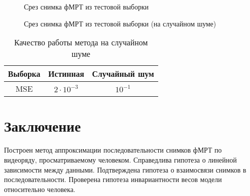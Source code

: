 \documentclass[a4paper, 12pt]{article}
\begin{document}
	\begin{figure}[h!]
		\centering
		\hfill
		\hfill
		\caption{Срез снимка фМРТ из тестовой выборки}
		\label{fig:7}
	\end{figure}

	\begin{figure}[h!]
		\centering
		\hfill
		\hfill
		\caption{Срез снимка фМРТ из тестовой выборки (на случайном шуме)}
		\label{fig:8}
	\end{figure}

	\begin{table}[h!]
		\centering
		\begin{tabular}{|c|c|c|}
			\hline
			Выборка	&	Истинная	&	Случайный шум \\ \hline \hline
			MSE		& 	$2 \cdot 10^{-3}$	 &		$10^{-1}$ \\ \hline
		\end{tabular}
		\caption{Качество работы метода на случайном шуме}
		\label{table:2}
	\end{table}

\newpage

\section{Заключение}

	Построен метод аппроксимации последовательности снимков фМРТ по видеоряду,
	просматриваемому человеком.
	Справедлива гипотеза о линейной зависимости между данными.
	Подтверждена гипотеза о взаимосвязи снимков в последовательности.
	Проверена гипотеза инвариантности весов модели относительно человека.

\newpage



\end{document}
